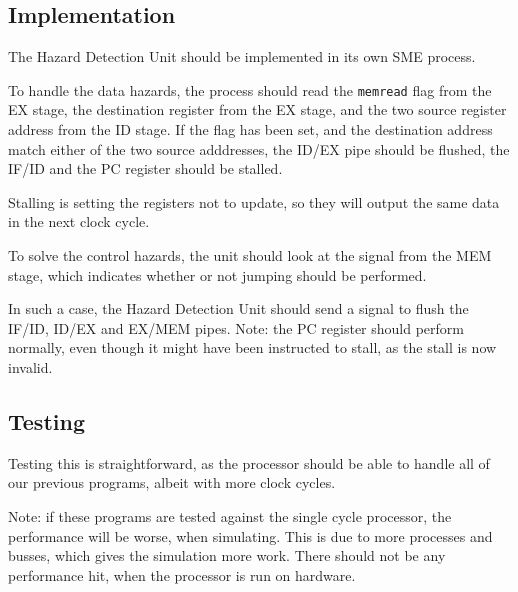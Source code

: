 \documentclass{beamer}
\begin{document}
\subsection{Implementation}
\begin{frame}
    The Hazard Detection Unit should be implemented in its own SME process.

    \vspace{\baselineskip}
    To handle the data hazards, the process should read the \texttt{memread}
    flag from the EX stage, the destination register from the EX stage, and the
    two source register address from the ID stage. If the flag has been set,
    and the destination address match either of the two source adddresses, the
    ID/EX pipe should be flushed, the IF/ID and the PC register should be
    stalled.

    \vspace{\baselineskip}
    Stalling is setting the registers not to update, so they will output the
    same data in the next clock cycle.
\end{frame}
\begin{frame}
    To solve the control hazards, the unit should look at the signal from the
    MEM stage, which indicates whether or not jumping should be performed.

    \vspace{\baselineskip}
    In such a case, the Hazard Detection Unit should send a signal to flush the
    IF/ID, ID/EX and EX/MEM pipes. Note: the PC register should perform
    normally, even though it might have been instructed to stall, as the stall
    is now invalid.
\end{frame}

\subsection{Testing}
\begin{frame}
    Testing this is straightforward, as the processor should be able to handle
    all of our previous programs, albeit with more clock cycles.

    \vspace{\baselineskip}
    Note: if these programs are tested against the single cycle processor, the
    performance will be worse, when simulating. This is due to more processes
    and busses, which gives the simulation more work. There should not be any
    performance hit, when the processor is run on hardware.
\end{frame}

\AtBeginSection{}
\section*{}

%  
%  
\end{document}
